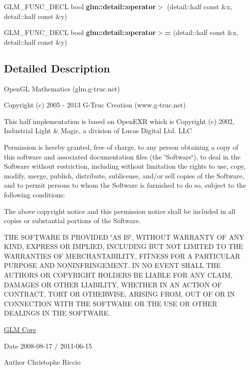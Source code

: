 \begin{DoxyCompactItemize}
\item 
\hypertarget{namespaceglm_1_1detail_a4a0c4141412655598450614b54cd312d}{}G\+L\+M\+\_\+\+F\+U\+N\+C\+\_\+\+D\+E\+C\+L bool {\bfseries glm\+::detail\+::operator$>$} (detail\+::half const \&x, detail\+::half const \&y)\label{namespaceglm_1_1detail_a4a0c4141412655598450614b54cd312d}

\item 
\hypertarget{namespaceglm_1_1detail_aed4ce34912db5756cc5f1e41227c8930}{}G\+L\+M\+\_\+\+F\+U\+N\+C\+\_\+\+D\+E\+C\+L bool {\bfseries glm\+::detail\+::operator$>$=} (detail\+::half const \&x, detail\+::half const \&y)\label{namespaceglm_1_1detail_aed4ce34912db5756cc5f1e41227c8930}

\end{DoxyCompactItemize}


\subsection{Detailed Description}
Open\+G\+L Mathematics (glm.\+g-\/truc.\+net)

Copyright (c) 2005 -\/ 2013 G-\/\+Truc Creation (www.\+g-\/truc.\+net)

This half implementation is based on Open\+E\+X\+R which is Copyright (c) 2002, Industrial Light \& Magic, a division of Lucas Digital Ltd. L\+L\+C

Permission is hereby granted, free of charge, to any person obtaining a copy of this software and associated documentation files (the \char`\"{}\+Software\char`\"{}), to deal in the Software without restriction, including without limitation the rights to use, copy, modify, merge, publish, distribute, sublicense, and/or sell copies of the Software, and to permit persons to whom the Software is furnished to do so, subject to the following conditions\+:

The above copyright notice and this permission notice shall be included in all copies or substantial portions of the Software.

T\+H\+E S\+O\+F\+T\+W\+A\+R\+E I\+S P\+R\+O\+V\+I\+D\+E\+D \char`\"{}\+A\+S I\+S\char`\"{}, W\+I\+T\+H\+O\+U\+T W\+A\+R\+R\+A\+N\+T\+Y O\+F A\+N\+Y K\+I\+N\+D, E\+X\+P\+R\+E\+S\+S O\+R I\+M\+P\+L\+I\+E\+D, I\+N\+C\+L\+U\+D\+I\+N\+G B\+U\+T N\+O\+T L\+I\+M\+I\+T\+E\+D T\+O T\+H\+E W\+A\+R\+R\+A\+N\+T\+I\+E\+S O\+F M\+E\+R\+C\+H\+A\+N\+T\+A\+B\+I\+L\+I\+T\+Y, F\+I\+T\+N\+E\+S\+S F\+O\+R A P\+A\+R\+T\+I\+C\+U\+L\+A\+R P\+U\+R\+P\+O\+S\+E A\+N\+D N\+O\+N\+I\+N\+F\+R\+I\+N\+G\+E\+M\+E\+N\+T. I\+N N\+O E\+V\+E\+N\+T S\+H\+A\+L\+L T\+H\+E A\+U\+T\+H\+O\+R\+S O\+R C\+O\+P\+Y\+R\+I\+G\+H\+T H\+O\+L\+D\+E\+R\+S B\+E L\+I\+A\+B\+L\+E F\+O\+R A\+N\+Y C\+L\+A\+I\+M, D\+A\+M\+A\+G\+E\+S O\+R O\+T\+H\+E\+R L\+I\+A\+B\+I\+L\+I\+T\+Y, W\+H\+E\+T\+H\+E\+R I\+N A\+N A\+C\+T\+I\+O\+N O\+F C\+O\+N\+T\+R\+A\+C\+T, T\+O\+R\+T O\+R O\+T\+H\+E\+R\+W\+I\+S\+E, A\+R\+I\+S\+I\+N\+G F\+R\+O\+M, O\+U\+T O\+F O\+R I\+N C\+O\+N\+N\+E\+C\+T\+I\+O\+N W\+I\+T\+H T\+H\+E S\+O\+F\+T\+W\+A\+R\+E O\+R T\+H\+E U\+S\+E O\+R O\+T\+H\+E\+R D\+E\+A\+L\+I\+N\+G\+S I\+N T\+H\+E S\+O\+F\+T\+W\+A\+R\+E.

\hyperlink{group__core}{G\+L\+M Core}

\begin{DoxyDate}{Date}
2008-\/08-\/17 / 2011-\/06-\/15 
\end{DoxyDate}
\begin{DoxyAuthor}{Author}
Christophe Riccio 
\end{DoxyAuthor}
